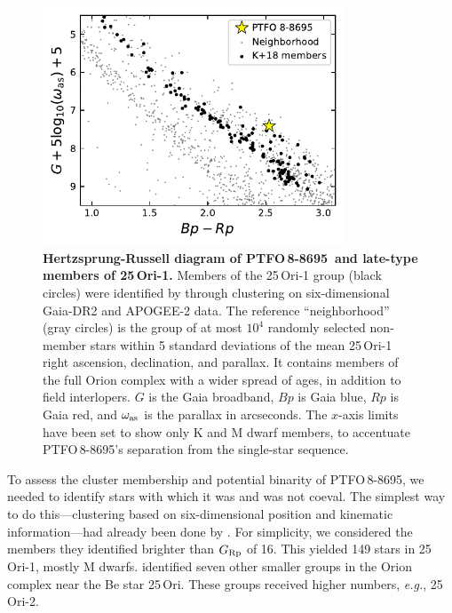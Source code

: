 \documentclass[12pt,twocolumn,tighten]{aastex62}
\newcommand{\ptfo}{PTFO$\,$8-8695}
\begin{document}
\begin{figure}[t]
	\begin{center}
		\leavevmode
		\includegraphics[width=0.8\textwidth]{f5.pdf}
	\end{center}
	\vspace{-0.7cm}
	\caption{ {\bf Hertzsprung-Russell diagram of \ptfo\ and late-type members of 25$\,$Ori-1.}
  Members of the 25$\,$Ori-1 group (black circles) were identified by
  \citet{kounkel_apogee2_2018} through clustering on six-dimensional
  Gaia-DR2 and APOGEE-2 data.  The reference
  ``neighborhood'' (gray circles) is the group of at most $10^4$
  randomly selected non-member stars within 5 standard deviations of
  the mean 25$\,$Ori-1 right ascension, declination, and parallax.
  It contains members of the full Orion complex with a wider spread of ages,
  in addition to field interlopers.
  $G$ is the Gaia broadband, $Bp$ is Gaia blue, $Rp$ is Gaia red, and
  $\omega_{\rm as}$ is the parallax in arcseconds.
  The $x$-axis limits have been set to show only K and M dwarf
  members, to accentuate \ptfo's separation from the
  single-star sequence.
	\label{fig:gaia}
	}
\end{figure}

\citet{schmidt_direct_2016}
\citet{lee_evidence_2018}

To assess the cluster membership and potential
binarity of \ptfo, we needed to identify stars with which it was and was
not coeval.  The simplest way to do this---clustering based on
six-dimensional position and kinematic information---had already been
done by \citet{kounkel_apogee2_2018}.  For simplicity, we considered
the members they identified brighter than $G_{\rm Rp}$ of 16.  This
yielded 149 stars in 25$\,$Ori-1, mostly M dwarfs.
\citet{kounkel_apogee2_2018} identified seven other smaller
groups in the Orion complex near the Be star 25$\,$Ori. These groups
received higher numbers, {\it e.g.}, 25$\,$Ori-2.
\end{document}
